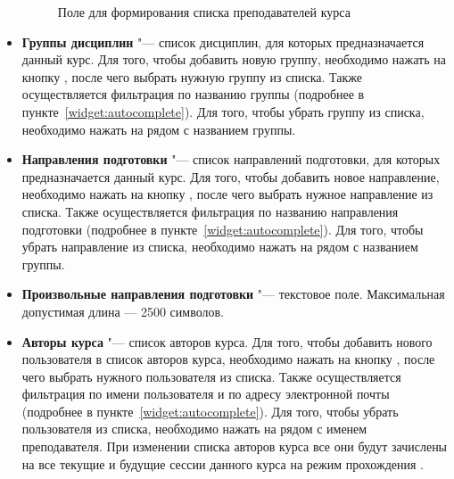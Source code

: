 \begin{itemize}
\begin{figure}[H]
			\caption{Поле для формирования списка преподавателей курса}
			\label{img:course:instructor_list}
		\end{figure}		

		\item \textbf{Группы дисциплин} "--- список дисциплин, для которых предназначается данный курс. Для того, чтобы добавить новую группу, необходимо нажать на кнопку , после чего выбрать нужную группу из списка. Также осуществляется фильтрация по названию группы (подробнее в пункте~\ref{widget:autocomplete}). Для того, чтобы убрать группу из списка, необходимо нажать на  рядом с названием группы.
		\item \textbf{Направления подготовки} "--- список направлений подготовки, для которых предназначается данный курс. Для того, чтобы добавить новое направление, необходимо нажать на кнопку , после чего выбрать нужное направление из списка. Также осуществляется фильтрация по названию направления подготовки (подробнее в пункте~\ref{widget:autocomplete}). Для того, чтобы убрать направление из списка, необходимо нажать на  рядом с названием группы.
		\item \textbf{Произвольные направления подготовки} "--- текстовое поле.
		Максимальная допустимая длина --- 2500 символов.
		\item \textbf{Авторы курса} "--- список авторов курса.  Для того, чтобы добавить нового пользователя в список авторов курса, необходимо нажать на кнопку , после чего выбрать нужного пользователя из списка. Также осуществляется фильтрация по имени пользователя и по адресу электронной почты (подробнее в пункте~\ref{widget:autocomplete}). Для того, чтобы убрать пользователя из списка, необходимо нажать на  рядом с именем преподавателя.
		При изменении списка авторов курса все они будут зачислены на все текущие и будущие сессии данного курса на режим прохождения .
	\end{itemize}
